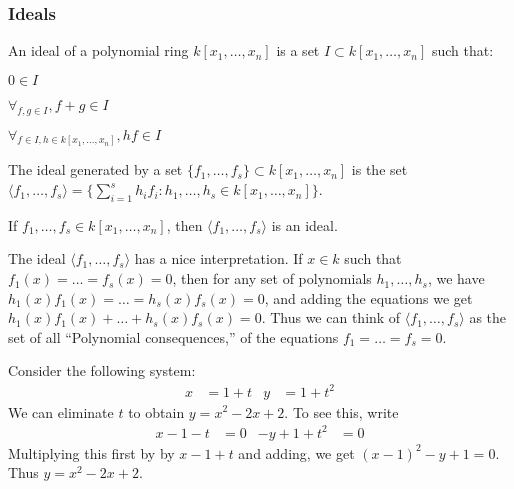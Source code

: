 \documentclass[crop=false,class=article,oneside]{standalone}
\begin{document}
        \subsubsection{Ideals}
            \begin{definition}
                An ideal of a polynomial ring
                $k[x_1,\hdots ,x_n]$ is a set
                $I\subset k[x_1,\hdots ,x_n]$ such that:
                \begin{enumerate}
                    \begin{multicols}{3}
                        \item $0\in I$
                        \item $\forall_{f,g\in I}, f+g\in I$ 
                        \item $\forall_{f\in I, h\in k[x_1,\hdots ,x_n]},%
                               hf\in I$
                    \end{multicols}
                \end{enumerate}
            \end{definition}
            \begin{definition}
                The ideal generated by a set
                $\{f_1,\hdots, f_s\}\subset k[x_1,\hdots ,x_n]$
                is the set
                $\langle f_1,\hdots,f_s\rangle%
                 =\{\sum_{i=1}^{s} h_i f_i:%
                    h_1,\hdots,h_s\in k[x_1,\hdots ,x_n]\}$.
            \end{definition}
            \begin{theorem}
                If $f_1,\hdots, f_s\in k[x_1,\hdots ,x_n]$,
                then $\langle f_1,\hdots, f_s\rangle$ is an ideal.
            \end{theorem}
            \begin{remark}
                The ideal $\langle f_1,\hdots, f_s\rangle$ has a nice
                interpretation. If $x\in k$ such that
                $f_1(x)=\hdots=f_s(x)=0$, then for any set
                of polynomials $h_1,\hdots, h_s$, we have
                $h_1(x)f_1(x)=\hdots=h_s(x)f_s(x)=0$,
                and adding the equations we get
                $h_1(x)f_1(x)+\hdots+h_s(x)f_s(x)=0$.
                Thus we can think of
                $\langle f_1,\hdots,f_s\rangle$ as the set
                of all ``Polynomial consequences,''
                of the equations $f_1=\hdots=f_s=0$.
            \end{remark}
            \begin{example}
                Consider the following system:
                \begin{align*}
                    x&=1+t&y&=1+t^{2}
                \end{align*}
                We can eliminate $t$ to
                obtain $y=x^2-2x+2$. To see this, write
                \begin{align*}
                    x-1-t&=0&-y+1+t^{2}&=0
                \end{align*}
                Multiplying this first by by $x-1+t$
                and adding, we get $(x-1)^2-y+1=0$.
                Thus $y=x^2-2x+2$.
            \end{example}
\end{document}

